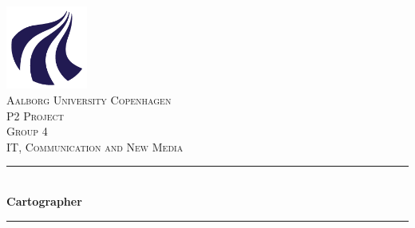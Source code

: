 \documentclass[12p]{article}
\newcommand{\HRule}{\rule{\linewidth}{0.5mm}} %
\begin{document}

\begin{titlepage}
	 
	\center
	 
		
	\includegraphics[width=0.2\textwidth]{pics/AAU_Logo.png}\\[1cm]
		 
			
		\textsc{\LARGE Aalborg University Copenhagen}\\[1.5cm]
			
		\textsc{\Large P2 Project}\\[0.5cm]
			
		\textsc{\large Group 4}\\[0.5cm]
			
		\textsc{\large IT, Communication and New Media}\\[0.5cm]
			
			
			
		\HRule\\[0.4cm]
			
		{\huge\bfseries Cartographer}\\[0.4cm]
		
		\HRule\\[0.4cm]
			
			
			

\end{titlepage}
\end{document}
